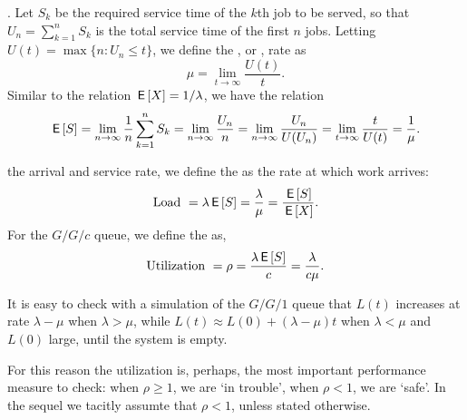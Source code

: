 .
Let $S_k$ be the required service time of the $k$th job to be served, so that $U_n = \sum_{k=1}^n S_k$ is the total service time of the first $n$ jobs.
Letting $ U(t) = \max\{n: U_n \leq t\}$, we define the , or , rate as
\begin{equation*}
 \mu = \lim_{t\to\infty} \frac{U(t)}t.
\end{equation*}
Similar to the relation  $\,\mathsf{E}\left[X\right]= 1/\lambda$, we have the relation
\begin{equation*}
 \,\mathsf{E}\left[S\right] = \lim_{n\to\infty} \frac 1 n \sum_{k=1}^n S_k = \lim_{n\to\infty} \frac{U_n}{n} = \lim_{n\to\infty} \frac{U_n}{U(U_n)} = \lim_{t\to\infty} \frac t{U(t)} = \frac 1 \mu.
\end{equation*}




 the arrival and service rate, we define the  as  the rate at which work arrives:
\begin{equation*}
\textrm{Load } =  \lambda \,\mathsf{E}\left[S\right] =\frac{\lambda}{\mu} = \frac{\,\mathsf{E}\left[S\right]}{\,\mathsf{E}\left[X\right]}.
\end{equation*}
For the $G/G/c$ queue, we define the  as,
\begin{equation}\label{eq:6}
\textrm{Utilization } = \rho=\frac{\lambda \,\mathsf{E}\left[S\right]}{c} = \frac{\lambda}{c \mu}.
\end{equation}

It is easy to check  with a simulation of the $G/G/1$ queue that $L(t)$ increases at rate $\lambda-\mu$ when $\lambda > \mu$, while $L(t) \approx L(0) + (\lambda - \mu)t$ when $\lambda< \mu$ and $L(0)$ large, until the system is empty.

For this reason the utilization is, perhaps, the most important performance measure to check: when $\rho\geq 1$, we are `in trouble', when $\rho < 1$, we are `safe'.
In the sequel we tacitly assumte that $\rho<1$, unless stated otherwise.




